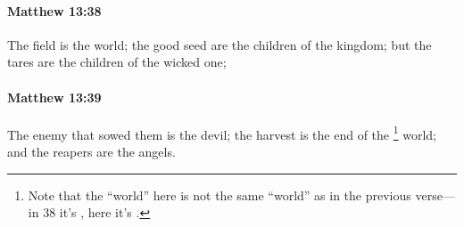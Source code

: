 		\paragraph{Matthew 13:38} %
			\label{MATTHEW-13-38}

			The field is the world; the good seed are the children of the kingdom; but the tares are the children of the wicked one;

			\begin{framed}
			\scriptsize
				\begin{compactdesc}
					\item[SBLG]  \hyperref[KOSMOS]{}
				\end{compactdesc}
			\end{framed}

		\paragraph{Matthew 13:39} %
			\label{MATTHEW-13-39}

			The enemy that sowed them is the devil; the harvest is the end of the%
				\footnote{%
					Note that the ``world'' here is not the same ``world'' as in the previous verse---in 38 it's , here it's .
					}
			world; and the reapers are the angels.


